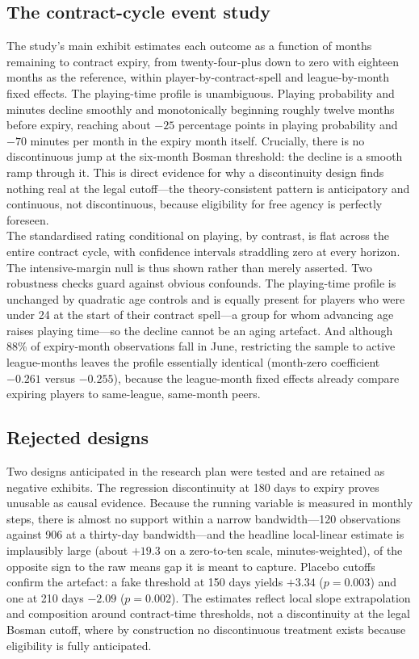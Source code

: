 \documentclass{article}
\begin{document}
\subsection{The contract-cycle event study}
\label{sec:results-eventstudy}

The study's main exhibit estimates each outcome as a function of months
remaining to contract expiry, from twenty-four-plus down to zero with eighteen
months as the reference, within player-by-contract-spell and league-by-month
fixed effects. The playing-time profile is unambiguous. Playing probability and
minutes decline smoothly and monotonically beginning roughly twelve months
before expiry, reaching about $-25$ percentage points in playing probability and
$-70$ minutes per month in the expiry month itself. Crucially, there is no
discontinuous jump at the six-month Bosman threshold: the decline is a smooth
ramp through it. This is direct evidence for why a discontinuity design finds
nothing real at the legal cutoff---the theory-consistent pattern is anticipatory
and continuous, not discontinuous, because eligibility for free agency is
perfectly foreseen. \\

The standardised rating conditional on playing, by contrast, is flat across the
entire contract cycle, with confidence intervals straddling zero at every
horizon. The intensive-margin null is thus shown rather than merely asserted.
Two robustness checks guard against obvious confounds. The playing-time profile
is unchanged by quadratic age controls and is equally present for players who
were under 24 at the start of their contract spell---a group for whom advancing
age raises playing time---so the decline cannot be an aging artefact. And
although 88\% of expiry-month observations fall in June, restricting the sample
to active league-months leaves the profile essentially identical (month-zero
coefficient $-0.261$ versus $-0.255$), because the league-month fixed effects
already compare expiring players to same-league, same-month peers.

\subsection{Rejected designs}
\label{sec:results-rejected}

Two designs anticipated in the research plan were tested and are retained as
negative exhibits. The regression discontinuity at 180 days to expiry proves
unusable as causal evidence. Because the running variable is measured in monthly
steps, there is almost no support within a narrow bandwidth---120 observations
against 906 at a thirty-day bandwidth---and the headline local-linear estimate is
implausibly large (about $+19.3$ on a zero-to-ten scale, minutes-weighted), of
the opposite sign to the raw means gap it is meant to capture. Placebo cutoffs
confirm the artefact: a fake threshold at 150 days yields $+3.34$ ($p = 0.003$)
and one at 210 days $-2.09$ ($p = 0.002$). The estimates reflect local slope
extrapolation and composition around contract-time thresholds, not a
discontinuity at the legal Bosman cutoff, where by construction no discontinuous
treatment exists because eligibility is fully anticipated. \\
\end{document}
